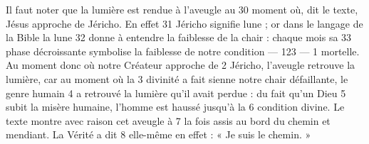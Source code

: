 Il faut noter que la lumière est rendue à l'aveugle au	 
30	 	moment où, dit le texte, Jésus approche de Jéricho. En effet	 
31	 	Jéricho signifie lune ; or dans le langage de la Bible la lune	 
32	 	donne à entendre la faiblesse de la chair : chaque mois sa	 
33	 	phase décroissante symbolise la faiblesse de notre condition	 
 	--- 123 ---	 
1	 	mortelle. Au moment donc où notre Créateur approche de	 
2	 	Jéricho, l'aveugle retrouve la lumière, car au moment où la	 
3	 	divinité a fait sienne notre chair défaillante, le genre humain	 
4	 	a retrouvé la lumière qu'il avait perdue : du fait qu'un Dieu	 
5	 	subit la misère humaine, l'homme est haussé jusqu'à la	 
6	 	condition divine. Le texte montre avec raison cet aveugle à	 
7	 	la fois assis au bord du chemin et mendiant. La Vérité a dit	 
8	 	elle-même en effet : « Je suis le chemin. »